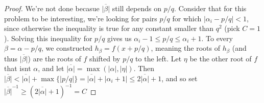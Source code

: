 \documentclass{article}
\newcommand{\abs}[1]{\left| #1 \right|}
\begin{document}
\begin{proof}
We're not done becasue $\overline{|\beta|}$ still depends on $p/q$. Consider that for this problem to be interesting, we're looking for pairs $p/q$ for which $\abs{\alpha_i - p/q} < 1$, since otherwise the inequality is true for any constant smaller than $q^2$ (pick $C = 1$). Solving this inequality for $p/q$ gives us $\alpha_i - 1 \leq p/q \leq \alpha_i + 1$. To every $\beta = \alpha - p/q$, we constructed $h_{\beta} = f(x + p/q)$, meaning the roots of $h_{\beta}$ (and thus $\overline{|\beta|}$) are the roots of $f$ shifted by $p/q$ to the left. Let $\eta$ be the other root of $f$ that isnt $\alpha$, and let $\overline{|\alpha|} = \max(\abs{\alpha}, \abs{\eta})$. Then $\overline{|\beta|} < \overline{|\alpha|} + \max\{\abs{p/q}\} = \overline{|\alpha|} + \abs{\alpha_i + 1} \leq 2\overline{|\alpha|} + 1$, and so set $\overline{|\beta|}^{-1} \geq (2\overline{|\alpha|} + 1)^{-1} = C$
\end{proof}
\printbibliography
\end{document}

